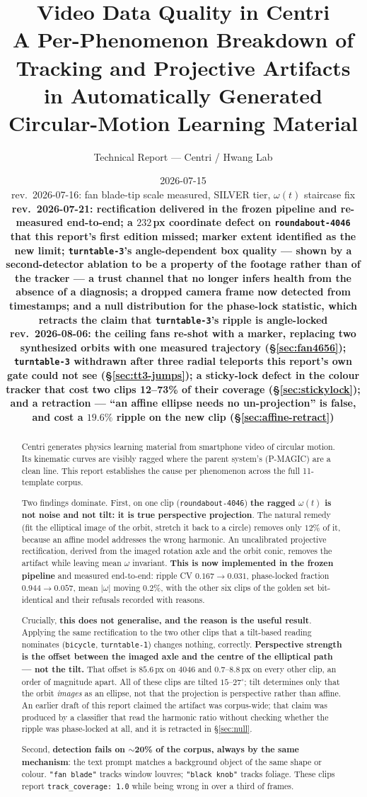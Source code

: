 \documentclass[11pt,a4paper]{article}
\title{\textbf{Video Data Quality in Centri}\\[0.3em]
\large A Per-Phenomenon Breakdown of Tracking and Projective Artifacts\\
in Automatically Generated Circular-Motion Learning Material}
\author{Technical Report --- Centri / Hwang Lab}
\date{2026-07-15\\[0.2em]
\normalsize rev.\ 2026-07-16: fan blade-tip scale measured, SILVER tier, $\omega(t)$ staircase fix\\
\normalsize \textbf{rev.\ 2026-07-21: rectification delivered in the frozen pipeline and
re-measured end-to-end; a $232$\,px coordinate defect on \texttt{roundabout-4046} that this
report's first edition missed; marker extent identified as the new limit; \texttt{turntable-3}'s
angle-dependent box quality --- shown by a second-detector ablation to be a property of the footage
rather than of the tracker --- a trust channel that no longer infers health from the absence of a
diagnosis; a dropped camera frame now detected from timestamps; and a null distribution for the
phase-lock statistic, which retracts the claim that \texttt{turntable-3}'s ripple is angle-locked}\\[0.2em]
\normalsize \textbf{rev.\ 2026-08-06: the ceiling fans re-shot with a marker, replacing two
synthesized orbits with one measured trajectory (\S\ref{sec:fan4656}); \texttt{turntable-3}
withdrawn after three radial teleports this report's own gate could not see
(\S\ref{sec:tt3-jumps}); a sticky-lock defect in the colour tracker that cost two clips 12--73\% of
their coverage (\S\ref{sec:stickylock}); and a \textbf{retraction} --- ``an affine ellipse needs
no un-projection'' is false, and cost a $19.6\%$ ripple on the new clip (\S\ref{sec:affine-retract})}}
\begin{document}
\maketitle

\begin{abstract}
\noindent
Centri generates physics learning material from smartphone video of circular motion. Its
kinematic curves are visibly ragged where the parent system's (P-MAGIC) are a clean line.
This report establishes the cause per phenomenon across the full 11-template corpus.

Two findings dominate. First, on one clip (\texttt{roundabout-4046}) \textbf{the ragged
$\omega(t)$ is not noise and not tilt: it is true perspective projection}. The natural remedy
(fit the elliptical image of the orbit, stretch it back to a circle) removes only $12\%$ of it,
because an affine model addresses the wrong harmonic. An uncalibrated projective rectification,
derived from the imaged rotation axle and the orbit conic, removes the artifact while leaving mean
$\omega$ invariant. \textbf{This is now implemented in the frozen pipeline} and measured end-to-end:
ripple CV $0.167 \rightarrow 0.031$, phase-locked fraction $0.944 \rightarrow 0.057$, mean
$|\omega|$ moving $0.2\%$, with the other six clips of the golden set bit-identical and their
refusals recorded with reasons.

Crucially, \textbf{this does not generalise, and the reason is the useful result}. Applying the
same rectification to the two other clips that a tilt-based reading nominates
(\texttt{bicycle}, \texttt{turntable-1}) changes nothing, correctly. \textbf{Perspective
strength is the offset between the imaged axle and the centre of the elliptical path --- not
the tilt.} That offset is $85.6$\,px on 4046 and $0.7$--$8.8$\,px on every other clip, an order
of magnitude apart. All of these clips are tilted $15$--$27^\circ$; tilt determines only that
the orbit \emph{images} as an ellipse, not that the projection is perspective rather than
affine. An earlier draft of this report claimed the artifact was corpus-wide; that claim was
produced by a classifier that read the harmonic ratio without checking whether the ripple was
phase-locked at all, and it is retracted in \S\ref{sec:null}.

Second, \textbf{detection fails on $\sim$20\% of the corpus, always by the same mechanism}: the
text prompt matches a background object of the same shape or colour. \texttt{"fan blade"}
tracks window louvres; \texttt{"black knob"} tracks foliage. These clips report
\texttt{track\_coverage: 1.0} while being wrong in over a third of frames.


\end{abstract}
\end{document}
